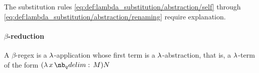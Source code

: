 \begin{remark}\label{rem:lambda_abstraction_substitution}
  The substitution rules \eqref{eq:def:lambda_substitution/abstraction/self} through \eqref{eq:def:lambda_substitution/abstraction/renaming} require explanation.
\end{remark}

\paragraph{\( \beta \)-reduction}

\begin{definition}\label{def:beta_redex}
  A \( \beta \)-regex is a \( \mathrm{\lambda} \)-application whose first term is a \( \mathrm{\lambda} \)-abstraction, that is, a \( \mathrm{\lambda} \)-term of the form \( (\qabs x M) N \)
\end{definition}
